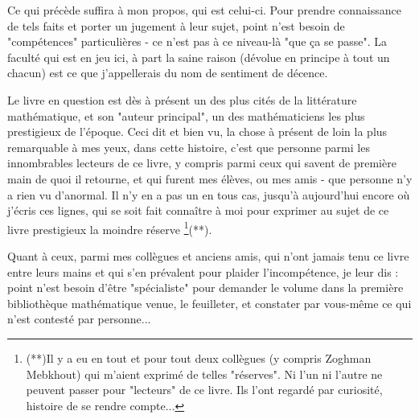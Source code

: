 Ce qui précède suffira à mon propos, qui est celui-ci. Pour prendre connaissance de tels faits et porter un jugement à leur sujet, point n'est besoin de "compétences" particulières - ce n'est pas à ce niveau-là "que ça se passe". La faculté qui est en jeu ici, à part la saine raison (dévolue en principe à tout un chacun) est ce que j'appellerais du nom de sentiment de décence.

Le livre en question est dès à présent un des plus cités de la littérature mathématique, et son "auteur principal", un des mathématiciens les plus prestigieux de l'époque. Ceci dit et bien vu, la chose à présent de loin la plus remarquable à mes yeux, dans cette histoire, c'est que personne parmi les innombrables lecteurs de ce livre, y compris parmi ceux qui savent de première main de quoi il retourne, et qui furent mes élèves, ou mes amis - que personne n'y a rien vu d'anormal. Il n'y en a pas un en tous cas, jusqu'à aujourd'hui encore où j'écris ces lignes, qui se soit fait connaître à moi pour exprimer au sujet de ce livre prestigieux la moindre réserve \footnote{(**)Il y a eu en tout et pour tout deux collègues (y compris Zoghman Mebkhout) qui m'aient exprimé de telles "réserves". Ni l'un ni l'autre ne peuvent passer pour "lecteurs" de ce livre. Ils l'ont regardé par curiosité, histoire de se rendre compte...}(**).

Quant à ceux, parmi mes collègues et anciens amis, qui n'ont jamais tenu ce livre entre leurs mains et qui s'en prévalent pour plaider l'incompétence, je leur dis : point n'est besoin d'être "spécialiste" pour demander le volume dans la première bibliothèque mathématique venue, le feuilleter, et constater par vous-même ce qui n'est contesté par personne...

